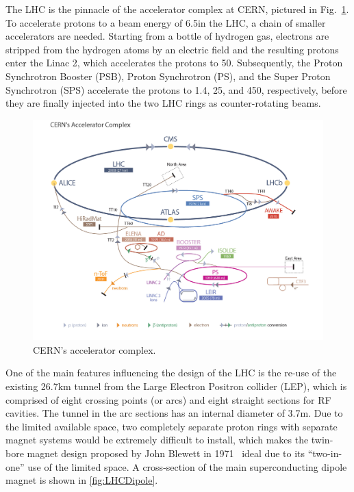 The LHC is the pinnacle of the accelerator
complex at CERN, pictured in Fig.~\ref{fig:LHCComplex}.  To accelerate
protons to a beam energy of 6.5\TeV in the LHC, a chain of smaller
accelerators are needed. Starting from a bottle of hydrogen gas,
electrons are stripped from the hydrogen atoms by an electric field
and the resulting protons enter the Linac 2, which accelerates the
protons to 50\MeV. Subsequently, the Proton Synchrotron Booster (PSB), Proton Synchrotron (PS), and the
Super Proton Synchrotron (SPS) accelerate the protons to 1.4\GeV, 25\GeV, and 450\GeV, respectively, before they are finally injected
into the two LHC rings as counter-rotating beams.

\begin{figure}\centering
\includegraphics[width=.9\textwidth]{figs/cms/LHC_default.jpg}
\caption{CERN's accelerator complex.\label{fig:LHCComplex}}
\end{figure}

One of the main features influencing the design of the LHC is the re-use of the
existing 26.7\unit{km} tunnel from the Large Electron Positron collider (LEP), which is
comprised of eight crossing points (or arcs) and eight straight sections for
RF cavities. The tunnel in the arc sections has an internal diameter of 3.7\unit{m}. Due to the limited available space, two completely separate
proton rings with separate magnet systems would be extremely difficult to install, which makes the twin-bore magnet design proposed by John
Blewett in 1971~\cite{Blewett:1068131} ideal due to its
``two-in-one'' use of the limited space. A cross-section of the main superconducting
dipole magnet is shown in \ref{fig:LHCDipole}.

